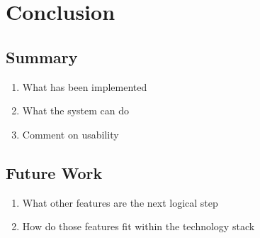 \documentclass{l4proj}
\begin{document}
\chapter{Conclusion}
\section{Summary}
\begin{enumerate}
	\item What has been implemented
	\item What the system can do
	\item Comment on usability
\end{enumerate}
\section{Future Work}
\begin{enumerate}
	\item What other features are the next logical step
	\item How do those features fit within the technology stack
\end{enumerate}
\end{document}
